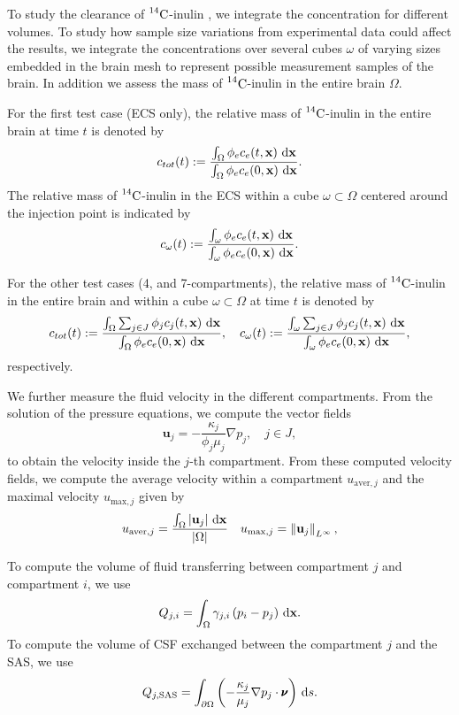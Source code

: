 \documentclass[10pt]{article}
\newcommand{\1}{^{(1)}}
\newcommand{\2}{^{(2)}}
\newcommand*{\dd}{\mathop{\kern0pt\mathrm{d}}\!{}}
\newcommand{\norm}[1]{\left\lVert#1\right\rVert}
\newcommand {\x}   {\mathbf{x}}
\newcommand{\Cinulin}{$\prescript{14}{}{\text{C}}$-inulin }
\begin{document}
To study the clearance of \Cinulin, we integrate the concentration for different volumes. To study how sample size variations from experimental data could affect the results, we integrate the concentrations over several cubes $\omega$ of varying sizes embedded in the brain mesh to represent possible measurement samples of the brain. In addition we assess the mass of \Cinulin in the entire brain $\Omega$. 

For the first test case (ECS only), the relative mass of \Cinulin in the entire brain at time $t$ is denoted by 
\[
c_{tot}(t) := \frac{\int_\Omega \phi_e c_e(t,\x) \, \dd \x }{ \int_\Omega \phi_e c_e(0,\x) \, \dd \x}.
\]
The relative mass of \Cinulin in the ECS within a cube $\omega \subset \Omega$ centered around the injection point is indicated by 
\[
c_{\omega}(t) :=  \frac{\int_{\omega}  \phi_e c_e(t,\x) \, \dd \x }{\int_\omega  \phi_e c_e(0,\x) \, \dd \x}.  
\]

For the other test cases (4, and 7-compartments), the relative mass of \Cinulin in the entire brain and within a cube $\omega \subset \Omega$ at time $t$ is denoted by
\[
c_{tot}(t) := \frac{\int_\Omega \sum_{j\in J}  \phi_j c_j(t,\x) \, \dd \x }{ \int_\Omega \phi_e c_e(0,\x) \, \dd \x}, \quad c_{\omega}(t) := \frac{\int_{\omega} \sum_{j\in J} \phi_j c_j(t,\x) \, \dd \x }{ \int_\omega \phi_e c_e(0,\x) \, \dd \x},
\]
respectively. 

We further measure the fluid velocity in the different compartments. From the solution of the pressure equations, we compute the vector fields
\begin{equation}
    \mathbf u_j = -\frac{\kappa_j}{\phi_j \mu_j}\nabla p_j, \quad j\in J, 
    \label{eq:velo}
\end{equation}
to obtain the velocity inside the $j$-th compartment. 
From these computed velocity fields, we compute the average velocity within a compartment $u_{\text{aver},j}$ and the maximal velocity $u_{\text{max},j}$ given by 
\begin{equation}
u_{\text{aver},j} = \frac{\int_\Omega | \mathbf u_j | \, \dd \x}{| \Omega |}\quad u_{\text{max},j} = \norm{ \mathbf u_j }_{L^\infty},
\end{equation}

To compute the volume of fluid transferring between compartment $j$ and compartment $i$, we use
\begin{equation}
Q_{j,i} = \int_{\Omega}  \gamma_{j , i} \left( p_i - p_j \right)\, \dd \x.
\label{eq:compute-transfer}
\end{equation}
To compute the volume of CSF exchanged between the compartment $j$ and the SAS, we use 
\begin{equation}
Q_{j,\text{SAS}} = \int_{\partial \Omega} \left(- \frac{\kappa_j}{ \mu_j}\nabla p_j  \cdot\pmb{\nu}\right) \,\dd s.\label{eq:compute-transfer-SAS}
\end{equation}
\end{document}
